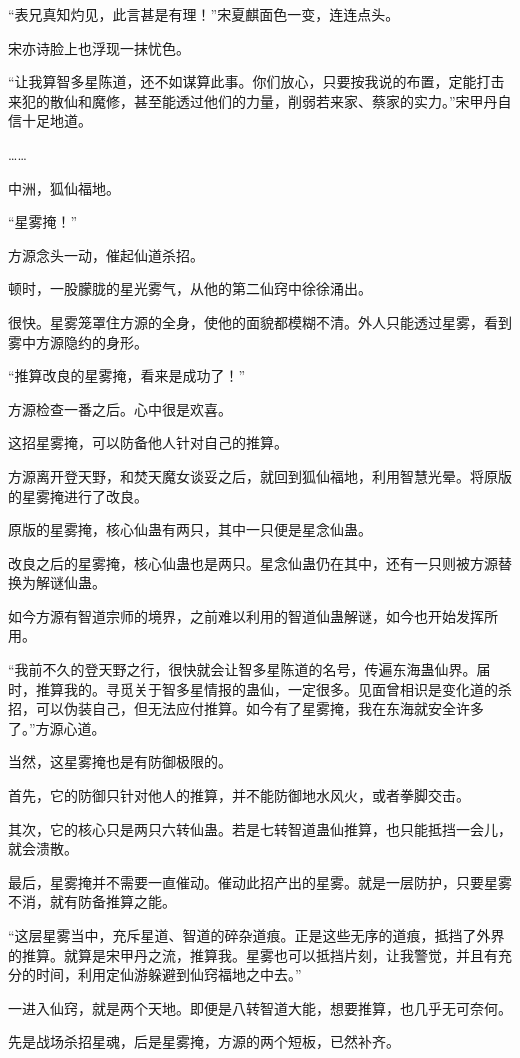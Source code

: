 \begin{this_body}
“表兄真知灼见，此言甚是有理！”宋夏麒面色一变，连连点头。

宋亦诗脸上也浮现一抹忧色。

“让我算智多星陈道，还不如谋算此事。你们放心，只要按我说的布置，定能打击来犯的散仙和魔修，甚至能透过他们的力量，削弱若来家、蔡家的实力。”宋甲丹自信十足地道。

……

中洲，狐仙福地。

“星雾掩！”

方源念头一动，催起仙道杀招。

顿时，一股朦胧的星光雾气，从他的第二仙窍中徐徐涌出。

很快。星雾笼罩住方源的全身，使他的面貌都模糊不清。外人只能透过星雾，看到雾中方源隐约的身形。

“推算改良的星雾掩，看来是成功了！”

方源检查一番之后。心中很是欢喜。

这招星雾掩，可以防备他人针对自己的推算。

方源离开登天野，和焚天魔女谈妥之后，就回到狐仙福地，利用智慧光晕。将原版的星雾掩进行了改良。

原版的星雾掩，核心仙蛊有两只，其中一只便是星念仙蛊。

改良之后的星雾掩，核心仙蛊也是两只。星念仙蛊仍在其中，还有一只则被方源替换为解谜仙蛊。

如今方源有智道宗师的境界，之前难以利用的智道仙蛊解谜，如今也开始发挥所用。

“我前不久的登天野之行，很快就会让智多星陈道的名号，传遍东海蛊仙界。届时，推算我的。寻觅关于智多星情报的蛊仙，一定很多。见面曾相识是变化道的杀招，可以伪装自己，但无法应付推算。如今有了星雾掩，我在东海就安全许多了。”方源心道。

当然，这星雾掩也是有防御极限的。

首先，它的防御只针对他人的推算，并不能防御地水风火，或者拳脚交击。

其次，它的核心只是两只六转仙蛊。若是七转智道蛊仙推算，也只能抵挡一会儿，就会溃散。

最后，星雾掩并不需要一直催动。催动此招产出的星雾。就是一层防护，只要星雾不消，就有防备推算之能。

“这层星雾当中，充斥星道、智道的碎杂道痕。正是这些无序的道痕，抵挡了外界的推算。就算是宋甲丹之流，推算我。星雾也可以抵挡片刻，让我警觉，并且有充分的时间，利用定仙游躲避到仙窍福地之中去。”

一进入仙窍，就是两个天地。即便是八转智道大能，想要推算，也几乎无可奈何。

先是战场杀招星魂，后是星雾掩，方源的两个短板，已然补齐。


\end{this_body}
